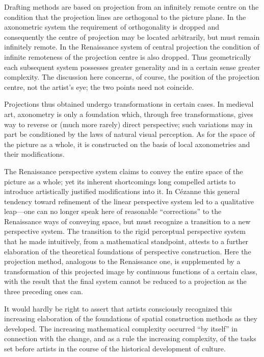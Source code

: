 Drafting methods are based on projection from an infinitely remote centre on the condition
that the projection lines are orthogonal to the picture plane.  In the axonometric system
the requirement of orthogonality is dropped and consequently the centre of projection may
be located arbitrarily, but must remain infinitely remote.  In the Renaissance system of
central projection the condition of infinite remoteness of the projection centre is also
dropped.  Thus geometrically each subsequent system possesses greater generality and in a
certain sense greater complexity.  The discussion here concerns, of course, the position
of the projection centre, not the artist's eye; the two points need not coincide.

Projections thus obtained undergo transformations in certain cases.  In medieval art,
axonometry is only a foundation which, through free transformations, gives way to reverse
or (much more rarely) direct perspective; such variations may in part be conditioned by
the laws of natural visual perception.  As for the space of the picture as a whole, it is
constructed on the basis of local axonometries and their modifications.

The Renaissance perspective system claims to convey the entire space of the picture as a
whole; yet its inherent shortcomings long compelled artists to introduce artistically
justified modifications into it.  In Cézanne this general tendency toward refinement of
the linear perspective system led to a qualitative leap---one can no longer speak here of
reasonable ``corrections'' to the Renaissance ways of conveying space, but must recognize
a transition to a new perspective system.  The transition to the rigid perceptual
perspective system that he made intuitively, from a mathematical standpoint, attests to
a further elaboration of the theoretical foundations of perspective construction.  Here
the projection method, analogous to the Renaissance one, is supplemented by a
transformation of this projected image by continuous functions of a certain class, with
the result that the final system cannot be reduced to a projection as the three preceding
ones can.


It would hardly be right to assert that artists consciously recognized this increasing
elaboration of the foundations of spatial construction methods as they developed.  The
increasing mathematical complexity occurred ``by itself'' in connection with the change,
and as a rule the increasing complexity, of the tasks set before artists in the course of
the historical development of culture.

